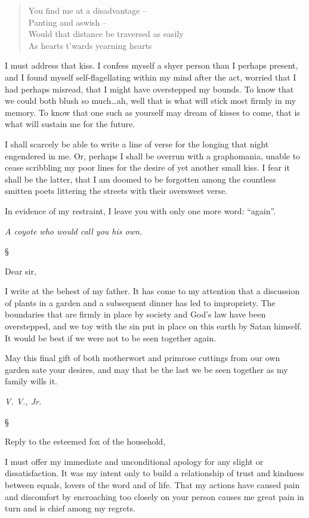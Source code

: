 \documentclass[12pt,letterpaper,oneside]{memoir}
\newcommand\secdiv{
  \begin{center}
    \S
  \end{center}
}
\begin{document}
  \begin{quote}
  You find me at a disadvantage --\\
  Panting and aswish --\\
  Would that distance be traversed as easily\\
  As hearts t'wards yearning hearts
  \end{quote}

  I must address that kiss. I confess myself a shyer person than I perhaps
  present, and I found myself self-flagellating within my mind after the
  act, worried that I had perhaps misread, that I might have overstepped
  my bounds. To know that we could both blush so much\ldots{}ah, well that
  is what will stick most firmly in my memory. To know that one such as
  yourself may dream of kisses to come, that is what will sustain me for
  the future.

  I shall scarcely be able to write a line of verse for the longing that
  night engendered in me. Or, perhaps I shall be overrun with a
  graphomania, unable to cease scribbling my poor lines for the desire of
  yet another small kiss. I fear it shall be the latter, that I am doomed
  to be forgotten among the countless smitten poets littering the streets
  with their oversweet verse.

  In evidence of my restraint, I leave you with only one more word:
  ``again''.

  \emph{A coyote who would call you his own.}

  \secdiv

  Dear sir,

  I write at the behest of my father. It has come to my attention that a
  discussion of plants in a garden and a subsequent dinner has led to
  impropriety. The boundaries that are firmly in place by society and
  God's law have been overstepped, and we toy with the sin put in place on
  this earth by Satan himself. It would be best if we were not to be seen
  together again.

  May this final gift of both motherwort and primrose cuttings from our
  own garden sate your desires, and may that be the last we be seen
  together as my family wills it.

  \emph{V. V., Jr.}

  \secdiv

  Reply to the esteemed fox of the household,

  I must offer my immediate and unconditional apology for any slight or
  dissatisfaction. It was my intent only to build a relationship of trust
  and kindness between equals, lovers of the word and of life. That my
  actions have caused pain and discomfort by encroaching too closely on
  your person causes me great pain in turn and is chief among my regrets.
\end{document}
